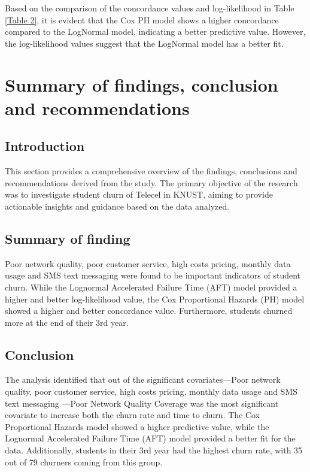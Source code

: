 \documentclass[doublespacing,12pt]{report}
\begin{document}
{\begin{table}[H]
		\end{table}

\normalsize{\noindent Based on the comparison of the concordance values and log-likelihood in Table \ref{Table 2}, it is evident that the Cox PH model shows a higher concordance compared to the LogNormal model, indicating a better predictive value. However, the log-likelihood values suggest that the LogNormal model has a better fit. }

\newpage
\chapter{Summary of findings, conclusion and recommendations}

\section{Introduction}
\normalsize{ This section provides a comprehensive overview of the findings, conclusions and recommendations derived from the study. The primary objective of the research was to investigate student churn of Telecel in KNUST, aiming to provide actionable insights and guidance based on the data analyzed.}

\section{Summary of finding}
Poor network quality, poor customer service, high costs pricing, monthly data usage and SMS text messaging were found to be important indicators of student churn. While the Lognormal Accelerated Failure Time (AFT) model provided a higher and better log-likelihood value, the Cox Proportional Hazards (PH) model showed a higher and better concordance value. Furthermore, students churned more at the end of their 3rd year.

\section{Conclusion}
\normalsize{The analysis identified that out of the significant covariates—Poor network quality, poor customer service, high costs pricing, monthly data usage and SMS text messaging —Poor Network Quality Coverage was the most significant covariate to increase both the churn rate and time to churn. The Cox Proportional Hazards model showed a higher predictive value, while the Lognormal Accelerated Failure Time (AFT) model provided a better fit for the data. Additionally, students in their 3rd year had the highest churn rate, with 35 out of 79 churners coming from this group.}

}
\end{document}
